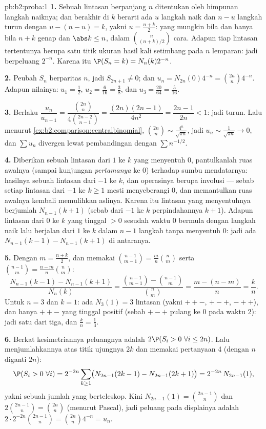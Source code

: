 \begin{solution}{pb:b2:proba:1}
\textbf{1.} Sebuah lintasan berpanjang $n$ ditentukan oleh himpunan
langkah naiknya; dan berakhir di $k$ berarti ada $u$ langkah naik dan $n - u$
langkah turun dengan $u - (n - u) = k$, yakni $u = \frac{n+k}2$:
yang mungkin bila dan hanya bila $n + k$ genap dan $\abs k \leq n$, dalam
$\binom{n}{(n+k)/2}$ cara. Adapun tiap lintasan tertentunya berupa satu titik
ukuran hasil kali setimbang pada $n$ lemparan: jadi berpeluang $2^{-n}$.
Karena itu $\P(S_n = k) = N_n(k)2^{-n}$.

\textbf{2.} Peubah $S_n$ berparitas $n$, jadi $S_{2n+1} \neq
0$; dan $u_n = N_{2n}(0)4^{-n} = \binom{2n}n4^{-n}$. Adapun nilainya:
$u_1 = \frac12$, $u_2 = \frac6{16} = \frac38$, dan $u_3 =
\frac{20}{64} = \frac5{16}$.

\textbf{3.} Berlaku $\dfrac{u_n}{u_{n-1}} =
\dfrac{\binom{2n}n}{4\binom{2n-2}{n-1}} =
\dfrac{(2n)(2n-1)}{4n^2} = \dfrac{2n-1}{2n} < 1$: jadi turun.
Lalu menurut \cref{ex:b2:comparison:centralbinomial}, $\binom{2n}n \sim
\frac{4^n}{\sqrt{\pi n}}$, jadi $u_n \sim \frac1{\sqrt{\pi n}}
\to 0$, dan $\sum u_n$ divergen lewat pembandingan dengan $\sum
n^{-1/2}$.

\textbf{4.} Diberikan sebuah lintasan dari $1$ ke $k$ yang menyentuh $0$,
pantulkanlah ruas awalnya (sampai kunjungan \emph{pertamanya} ke
$0$) terhadap sumbu mendatarnya: hasilnya sebuah lintasan dari
$-1$ ke $k$, dan operasinya berupa involusi --- sebab setiap
lintasan dari $-1$ ke $k \geq 1$ mesti menyeberangi $0$, dan memantulkan
ruas awalnya kembali memulihkan aslinya. Karena itu lintasan
yang menyentuhnya berjumlah $N_{n-1}(k + 1)$ (sebab dari $-1$ ke $k$
perpindahannya $k + 1$). Adapun lintasan dari $0$ ke $k$ yang tinggal $>
0$ sesudah waktu $0$ bermula dengan langkah naik lalu berjalan dari
$1$ ke $k$ dalam $n - 1$ langkah tanpa menyentuh $0$: jadi ada
$N_{n-1}(k-1) - N_{n-1}(k+1)$ di antaranya.

\textbf{5.} Dengan $m = \frac{n+k}2$, dan memakai
$\binom{n-1}{m-1} = \frac mn\binom nm$ serta $\binom{n-1}{m} =
\frac{n-m}n\binom nm$:
\[
\frac{N_{n-1}(k-1) - N_{n-1}(k+1)}{N_n(k)}
= \frac{\binom{n-1}{m-1} - \binom{n-1}{m}}{\binom nm}
= \frac{m - (n - m)}{n} = \frac kn .
\]
Untuk $n = 3$ dan $k = 1$: ada $N_3(1) = 3$ lintasan (yakni $++-$, $+-+$,
$-++$), dan hanya $++-$ yang tinggal positif (sebab $+-+$ pulang ke
$0$ pada waktu $2$): jadi satu dari tiga, dan $\frac kn = \frac13$.

\textbf{6.} Berkat kesimetriannya peluangnya adalah $2\P(S_i > 0\ \forall
i \leq 2n)$. Lalu menjumlahkannya atas titik ujungnya $2k$ dan memakai
pertanyaan 4 (dengan $n$ diganti $2n$):
\[
\P(S_i > 0\ \forall i) = 2^{-2n}\sum_{k\geq1}
\bigl(N_{2n-1}(2k-1) - N_{2n-1}(2k+1)\bigr)
= 2^{-2n}\,N_{2n-1}(1),
\]
yakni sebuah jumlah yang berteleskop. Kini $N_{2n-1}(1) = \binom{2n-1}{n}$ dan
$2\binom{2n-1}n = \binom{2n}n$ (menurut Pascal), jadi peluang pada
displainya adalah $2\cdot2^{-2n}\binom{2n-1}n =
\binom{2n}n4^{-n} = u_n$.


\end{solution}
